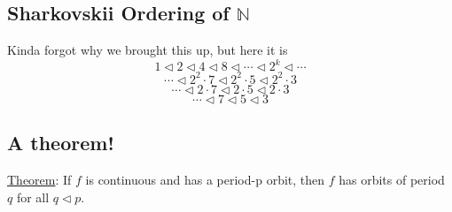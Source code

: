 \documentclass{article}
\begin{document}
\subsection*{Sharkovskii Ordering of $\mathbb{N}$}
Kinda forgot why we brought this up, but here it is
\[
1 \triangleleft 2 \triangleleft 4 \triangleleft 8 \triangleleft \cdots \triangleleft 2^k \triangleleft \cdots
\]
\[
\cdots \triangleleft 2^2 \cdot 7 \triangleleft 2^2 \cdot 5 \triangleleft 2^2 \cdot 3
\]
\[
\cdots \triangleleft 2 \cdot 7 \triangleleft 2 \cdot 5 \triangleleft 2 \cdot 3
\]
\[
\cdots \triangleleft 7 \triangleleft 5 \triangleleft 3
\]


\subsection{A theorem!}

\underline{Theorem}: If $f$ is continuous and has a period-p orbit, then $f$ has orbits of period $q$ for all $q\triangleleft p$.
\end{document}
